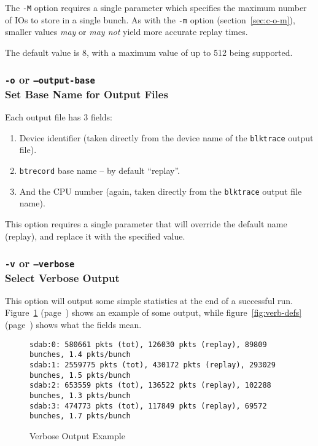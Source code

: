 \documentclass{article}
\begin{document}
The \texttt{-M} option requires a single parameter which specifies the
maximum number of IOs to store in a single bunch. As with the \texttt{-m}
option (section~\ref{sec:c-o-m}), smaller values \emph{may} or \emph{may not}
yield more accurate replay times.

The default value is 8, with a maximum value of up to 512 being supported.

\subsubsection{\label{sec:c-o-o}\texttt{-o} or
\texttt{--output-base}\\Set Base Name for Output Files}

Each output file has 3 fields:

\begin{enumerate}
  \item Device identifier (taken directly from the device name of the
  \texttt{blktrace} output file).

  \item \texttt{btrecord} base name -- by default ``replay''.

  \item And the CPU number (again, taken directly from the
  \texttt{blktrace} output file name).
\end{enumerate}

This option requires a single parameter that will override the default name
(replay), and replace it with the specified value.

\subsubsection{\label{sec:c-o-v}\texttt{-v} or
\texttt{--verbose}\\Select Verbose Output}

This option will output some simple statistics at the end of a successful
run. Figure~\ref{fig:verb-out} (page~\pageref{fig:verb-out}) shows
an example of some output, while figure~\ref{fig:verb-defs}
(page~\pageref{fig:verb-defs}) shows what the fields mean.

\begin{figure}[h!]
\begin{verbatim}
sdab:0: 580661 pkts (tot), 126030 pkts (replay), 89809 bunches, 1.4 pkts/bunch
sdab:1: 2559775 pkts (tot), 430172 pkts (replay), 293029 bunches, 1.5 pkts/bunch
sdab:2: 653559 pkts (tot), 136522 pkts (replay), 102288 bunches, 1.3 pkts/bunch
sdab:3: 474773 pkts (tot), 117849 pkts (replay), 69572 bunches, 1.7 pkts/bunch
\end{verbatim}
\caption{\label{fig:verb-out}Verbose Output Example}
\end{figure}
\FloatBarrier
\end{document}
